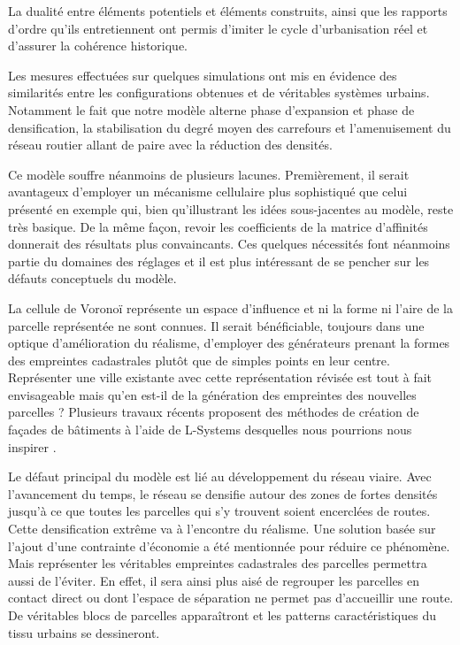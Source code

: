 \documentclass[10pt]{article}
\begin{document}
La dualité entre éléments potentiels et éléments construits, ainsi que
les rapports d'ordre qu'ils entretiennent ont permis d'imiter le cycle
d'urbanisation réel et d'assurer la cohérence historique.

Les mesures effectuées sur quelques simulations ont mis en évidence
des similarités entre les configurations obtenues et de véritables
systèmes urbains. Notamment le fait que notre modèle alterne phase
d'expansion et phase de densification, la stabilisation du degré moyen
des carrefours et l'amenuisement du réseau routier allant de paire
avec la réduction des densités.

Ce modèle souffre néanmoins de plusieurs lacunes. Premièrement, il
serait avantageux d'employer un mécanisme cellulaire plus sophistiqué
que celui présenté en exemple qui, bien qu'illustrant les idées
sous-jacentes au modèle, reste très basique. De la même façon, revoir
les coefficients de la matrice d'affinités donnerait des résultats
plus convaincants. Ces quelques nécessités font néanmoins partie du
domaines des réglages et il est plus intéressant de se pencher sur les
défauts conceptuels du modèle.

La cellule de Voronoï représente un espace d'influence et ni la forme
ni l'aire de la parcelle représentée ne sont connues. Il serait
bénéficiable, toujours dans une optique d'amélioration du réalisme,
d'employer des générateurs prenant la formes des empreintes
cadastrales plutôt que de simples points en leur centre. Représenter
une ville existante avec cette représentation révisée est tout à fait
envisageable mais qu'en est-il de la génération des empreintes des
nouvelles parcelles ? Plusieurs travaux récents proposent des méthodes
de création de façades de bâtiments à l'aide de L-Systems desquelles
nous pourrions nous inspirer \cite{Parish2001}.

Le défaut principal du modèle est lié au développement du réseau
viaire. Avec l'avancement du temps, le réseau se densifie autour des
zones de fortes densités jusqu'à ce que toutes les parcelles qui s'y
trouvent soient encerclées de routes. Cette densification extrême va à
l'encontre du réalisme. Une solution basée sur l'ajout d'une
contrainte d'économie a été mentionnée pour réduire ce phénomène. Mais
représenter les véritables empreintes cadastrales des parcelles
permettra aussi de l'éviter. En effet, il sera ainsi plus aisé de
regrouper les parcelles en contact direct ou dont l'espace de
séparation ne permet pas d'accueillir une route. De véritables blocs
de parcelles apparaîtront et les patterns caractéristiques du tissu
urbains se dessineront.

\printbibliography
\end{document}
